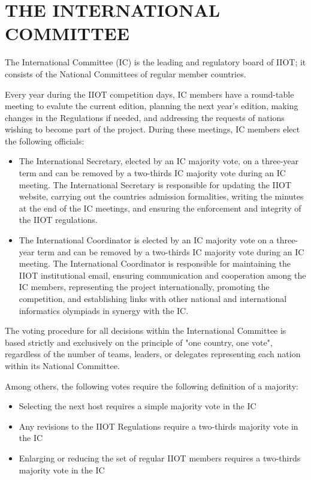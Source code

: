 \documentclass{article}
\begin{document}
\section{THE INTERNATIONAL COMMITTEE} 

The International Committee (IC) is the leading and regulatory board of IIOT; it consists of the National Committees of regular member countries. 

Every year during the IIOT competition days, IC members have a round-table meeting to evalute the current edition, planning the next year's edition, making changes in the Regulations if needed, and addressing the requests of nations wishing to become part of the project. During these meetings, IC members elect the following officials:

\begin{itemize}
    \item The International Secretary, elected by an IC majority vote, on a three-year term and can be removed by a two-thirds IC majority vote during an IC meeting. The International Secretary is responsible for updating the IIOT website, carrying out the countries admission formalities, writing the minutes at the end of the IC meetings, and ensuring the enforcement and integrity of the IIOT regulations.
    \item The International Coordinator is elected by an IC majority vote on a three-year term and can be removed by a two-thirds IC majority vote during an IC meeting. The International Coordinator is responsible for maintaining the IIOT institutional email, ensuring communication and cooperation among the IC members, representing the project internationally, promoting the competition, and establishing links with other national and international informatics olympiads in synergy with the IC. 
\end{itemize}

The voting procedure for all decisions within the International Committee is based strictly and exclusively on the principle of "one country, one vote", regardless of the number of teams, leaders, or delegates representing each nation within its National Committee.

Among others, the following votes require the following definition of a majority:

\begin{itemize}
    \item Selecting the next host requires a simple majority vote in the IC
    \item Any revisions to the IIOT Regulations require a two-thirds majority vote in the IC
    \item Enlarging or reducing the set of regular IIOT members requires a two-thirds majority vote in the IC
\end{itemize}
\end{document}
